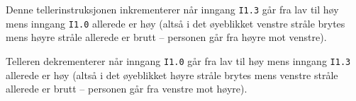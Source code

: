 
Denne tellerinstruksjonen inkrementerer når inngang {\tt I1.3} går fra lav til høy mens inngang {\tt I1.0} allerede er høy (altså i det øyeblikket venstre stråle brytes mens høyre stråle allerede er brutt -- personen går fra høyre mot venstre).

\vskip 10pt

Telleren dekrementerer når inngang {\tt I1.0} går fra lav til høy mens inngang {\tt I1.3} allerede er høy (altså i det øyeblikket høyre stråle brytes mens venstre stråle allerede er brutt -- personen går fra venstre mot høyre).



